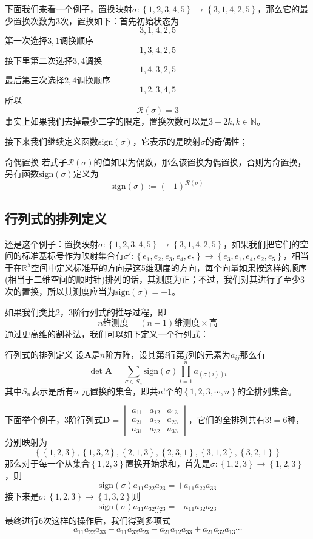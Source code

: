 下面我们来看一个例子，置换映射$\sigma:\left\{ 1,2,3,4,5 \right\}\rightarrow \left\{ 3,1,4,2,5 \right\}$，那么它的最少置换次数为3次，置换如下：首先初始状态为$$3,1,4,2,5$$第一次选择$3,1$调换顺序$$1,3,4,2,5$$接下里第二次选择$3,4$调换$$1,4,3,2,5$$最后第三次选择$2,4$调换顺序$$1,2,3,4,5$$所以$$\mathcal{R}(\sigma)=3$$事实上如果我们去掉最少二字的限定，置换次数可以是$3+2k,k\in \mathbb{N}$。

接下来我们继续定义函数$\text{sign}(\sigma)$，它表示的是映射$\sigma$的奇偶性；

\begin{definition}{奇偶置换}
	若式子$\mathcal{R}(\sigma)$的值如果为偶数，那么该置换为偶置换，否则为奇置换，另有函数$\text{sign}(\sigma)$定义为$$\text{sign}(\sigma):=(-1)^{\mathcal{R}(\sigma)}$$
\end{definition}

\subsection{行列式的排列定义}

还是这个例子：置换映射$\sigma:\left\{ 1,2,3,4,5 \right\}\rightarrow \left\{ 3,1,4,2,5 \right\}$，如果我们把它们的空间的标准基标号作为映射集合有$\sigma':\left\{ e_1,e_2,e_3,e_4,e_5 \right\}\rightarrow \left\{ e_3,e_1,e_4,e_2,e_5 \right\}$，相当于在$\mathbb{R}^5$空间中定义标准基的方向是这5维测度的方向，每个向量如果按这样的顺序(相当于二维空间的顺时针)排列的话，其测度为正；不过，我们对其进行了至少3次的置换，所以其测度应当为$\text{sign}(\sigma)=-1$。

如果我们类比2，3阶行列式的推导过程，即$$n\text{维测度}=(n-1)\text{维测度}\times \text{高}$$通过更高维的割补法，我们可以如下定义一个行列式：

\begin{definition}{行列式的排列定义}
	设$\mathbf{A}$是$n$阶方阵，设其第$i$行第$j$列的元素为$a_{ij}$那么有$$\det \mathbf{A}=\sum_{\sigma \in S_n}\text{sign} (\sigma)\prod_{i=1}^{n} a_{\left ( \sigma(i) \right )i}$$其中$S_n$表示是所有$n$ 元置换的集合，即共$n!$个的$\left\{ 1,2,3,\cdots,n \right\}$的全排列集合。
\end{definition}

下面举个例子，3阶行列式$\mathbf{D}=\begin{vmatrix}
	a_{11} & a_{12} & a_{13}\\
	a_{21} & a_{22} & a_{23}\\
	a_{31} & a_{32} & a_{33}
\end{vmatrix}$，它们的全排列共有$3!=6$种，分别映射为$$\left\{ \left\{ 1,2,3 \right\},\left\{ 1,3,2 \right\},\left\{ 2,1,3 \right\},\left\{ 2,3,1 \right\},\left\{ 3,1,2 \right\},\left\{ 3,2,1 \right\} \right\}$$那么对于每一个从集合$\left\{ 1,2,3 \right\}$置换开始求和，首先是$\sigma :\left\{ 1,2,3 \right\}\rightarrow \left\{ 1,2,3 \right\}$，则$$\text{sign}(\sigma)a_{11}a_{22}a_{23}=+a_{11}a_{22}a_{33}$$接下来是$\sigma :\left\{ 1,2,3 \right\}\rightarrow \left\{ 1,3,2 \right\}$则$$\text{sign}(\sigma)a_{11}a_{32}a_{23}=-a_{11}a_{32}a_{23}$$$$\cdots$$最终进行6次这样的操作后，我们得到多项式$$a_{11}a_{22}a_{33}-a_{11}a_{32}a_{23}-a_{21}a_{12}a_{33}+a_{21}a_{32}a_{13}\cdots$$

